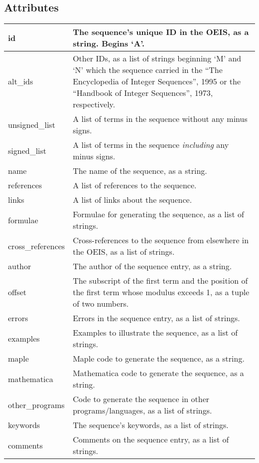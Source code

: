 \documentclass[letterpaper,10pt,english]{sphinxmanual}
\begin{document}
\subsection{Attributes}
\label{api:attributes}
\begin{tabulary}{\linewidth}{|L|L|}
\hline

id
 & 
The sequence's unique ID in the OEIS, as a string. Begins `A'.
\\
\hline
alt\_ids
 & 
Other IDs, as a list of strings beginning `M' and `N' which
the sequence carried in the ``The Encyclopedia of Integer
Sequences'', 1995 or the ``Handbook of Integer Sequences'', 1973,
respectively.
\\
\hline
unsigned\_list
 & 
A list of terms in the sequence without any minus signs.
\\
\hline
signed\_list
 & 
A list of terms in the sequence \emph{including} any minus signs.
\\
\hline
name
 & 
The name of the sequence, as a string.
\\
\hline
references
 & 
A list of references to the sequence.
\\
\hline
links
 & 
A list of links about the sequence.
\\
\hline
formulae
 & 
Formulae for generating the sequence, as a list of strings.
\\
\hline
cross\_references
 & 
Cross-references to the sequence from elsewhere in the OEIS,
as a list of strings.
\\
\hline
author
 & 
The author of the sequence entry, as a string.
\\
\hline
offset
 & 
The subscript of the first term and the position of the first
term whose modulus exceeds 1, as a tuple of two numbers.
\\
\hline
errors
 & 
Errors in the sequence entry, as a list of strings.
\\
\hline
examples
 & 
Examples to illustrate the sequence, as a list of strings.
\\
\hline
maple
 & 
Maple code to generate the sequence, as a string.
\\
\hline
mathematica
 & 
Mathematica code to generate the sequence, as a string.
\\
\hline
other\_programs
 & 
Code to generate the sequence in other programs/languages, as
a list of strings.
\\
\hline
keywords
 & 
The sequence's keywords, as a list of strings.
\\
\hline
comments
 & 
Comments on the sequence entry, as a list of strings.
\\
\hline\end{tabulary}
\end{document}
